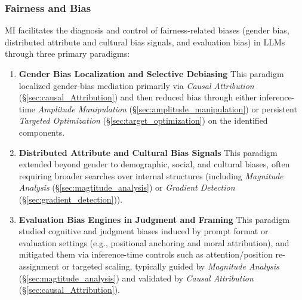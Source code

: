 \documentclass[11pt,letterpaper]{mystyle}
\begin{document}
\subsubsection{Fairness and Bias}
\label{sec:fairness_bias}
\begin{tcolorbox}[takeawaysbox, title={Summary of Application Paradigms}]

  MI facilitates the diagnosis and control of fairness-related biases (gender bias, distributed attribute and cultural bias signals, and evaluation bias) in LLMs through three primary paradigms:
  
  \begin{enumerate}[leftmargin=*, label=\arabic*)]
      \item \textbf{Gender Bias Localization and Selective Debiasing} This paradigm localized gender-bias mediation primarily via \textit{Causal Attribution} (\S\ref{sec:causal_Attribution}) and then reduced bias through either inference-time \textit{Amplitude Manipulation} (\S\ref{sec:amplitude_manipulation}) or persistent \textit{Targeted Optimization} (\S\ref{sec:target_optimization}) on the identified components.
      \item \textbf{Distributed Attribute and Cultural Bias Signals} This paradigm extended beyond gender to demographic, social, and cultural biases, often requiring broader searches over internal structures (including \textit{Magnitude Analysis} (\S\ref{sec:magtitude_analysis}) or \textit{Gradient Detection} (\S\ref{sec:gradient_detection})).
      \item \textbf{Evaluation Bias Engines in Judgment and Framing} This paradigm studied cognitive and judgment biases induced by prompt format or evaluation settings (e.g., positional anchoring and moral attribution), and mitigated them via inference-time controls such as attention/position re-assignment or targeted scaling, typically guided by \textit{Magnitude Analysis} (\S\ref{sec:magtitude_analysis}) and validated by \textit{Causal Attribution} (\S\ref{sec:causal_Attribution}).
  \end{enumerate}
  \end{tcolorbox}
  
\end{document}

